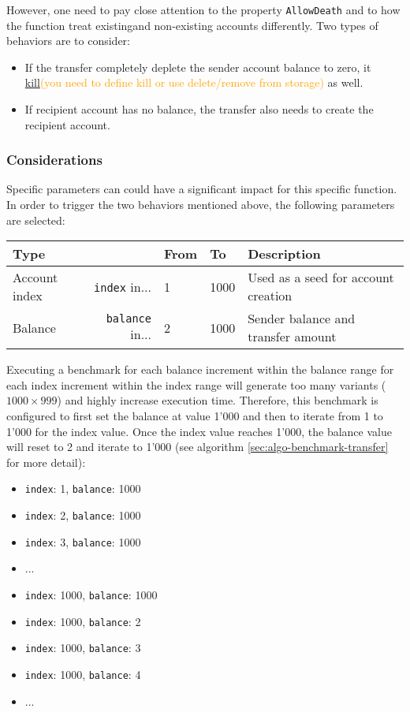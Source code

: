 \documentclass[11pt,a4paper]{article}
\newcommand{\syed}[2]{{\underline{#1}}\textcolor{orange}{(#2)}}
\begin{document}
However, one need to pay close attention to the property \verb|AllowDeath| and to how the function treat existingand non-existing accounts differently. Two types of behaviors are to consider:

\begin{itemize}
  \item If the transfer completely deplete the
  sender account balance to zero, it \syed{kill}{you need to define kill or use delete/remove from storage} as well.
  \item If recipient account
    has no balance, the transfer also needs to create the recipient account.
\end{itemize}

\subsubsection{Considerations}

Specific parameters can could have a significant impact for this specific function. In
order to trigger the two behaviors mentioned above, the following parameters are
selected:

\begin{center}
  \begin{tabular}{ l|r l l l }
    \textbf{Type} && \textbf{From} & \textbf{To} & \textbf{Description}\\
    \hline
    Account index & \verb|index| in... & 1 & 1000 & Used as a seed for account
    creation \\
    Balance & \verb|balance| in... & 2 & 1000 & Sender balance and transfer
    amount \\
  \end{tabular}
\end{center}

Executing a benchmark for each balance increment within the balance range for
each index increment within the index range will generate too many variants
($1000 \times 999$) and highly increase execution time. Therefore, this
benchmark is configured to first set the balance at value 1'000 and then to
iterate from 1 to 1'000 for the index value. Once the index value reaches 1'000,
the balance value will reset to 2 and iterate to 1'000 (see algorithm
\ref{sec:algo-benchmark-transfer} for more detail):

\begin{itemize}
  \item \verb|index|: 1, \verb|balance|: 1000
  \item \verb|index|: 2, \verb|balance|: 1000
  \item \verb|index|: 3, \verb|balance|: 1000
  \item ...
  \item \verb|index|: 1000, \verb|balance|: 1000
  \item \verb|index|: 1000, \verb|balance|: 2
  \item \verb|index|: 1000, \verb|balance|: 3
  \item \verb|index|: 1000, \verb|balance|: 4
  \item ...
\end{itemize}
\end{document}
